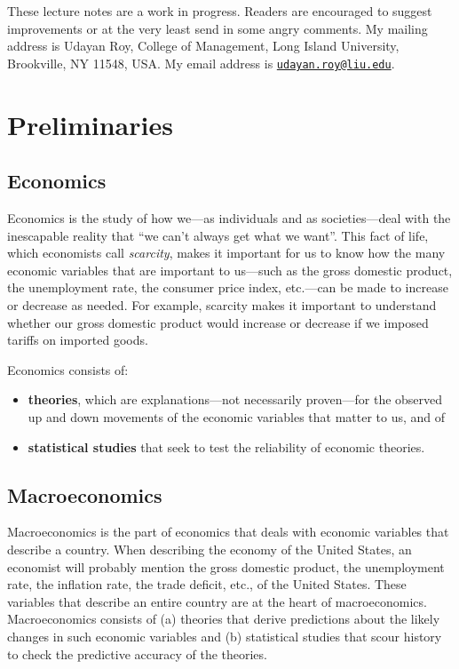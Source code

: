 \documentclass[
  letterpaper,
]{book}
\providecommand{\tightlist}{%
  \setlength{\itemsep}{0pt}\setlength{\parskip}{0pt}}\usepackage{longtable,booktabs,array}
\begin{document}
These lecture notes are a work in progress. Readers are encouraged to
suggest improvements or at the very least send in some angry comments.
My mailing address is Udayan Roy, College of Management, Long Island
University, Brookville, NY 11548, USA. My email address is
\href{mailto:udayan.roy@liu.edu}{\nolinkurl{udayan.roy@liu.edu}}.


\chapter{Preliminaries}\label{sec-preliminaries}

\section{Economics}\label{sec-economics}

Economics is the study of how we---as individuals and
as societies---deal with the inescapable reality that ``we can't always
get what we want''. This fact of life, which economists call
\emph{scarcity}, makes it important for us to know how the many economic
variables that are important to us---such as the gross domestic product,
the unemployment rate, the consumer price index, etc.---can be made to
increase or decrease as needed. For example, scarcity makes it important
to understand whether our gross domestic product would increase or
decrease if we imposed tariffs on imported goods.

Economics consists of:

\begin{itemize}
\tightlist
\item
  \textbf{theories}, which are explanations---not necessarily
  proven---for the observed up and down movements of the economic
  variables that matter to us, and of
\item
  \textbf{statistical studies} that seek to test the reliability of
  economic theories.
\end{itemize}

\section{Macroeconomics}\label{sec-macro}

Macroeconomics is the part of economics
that deals with economic variables that describe a country. When
describing the economy of the United States, an economist will probably
mention the gross domestic product, the unemployment rate, the inflation
rate, the trade deficit, etc., of the United States. These variables
that describe an entire country are at the heart of macroeconomics.
Macroeconomics consists of (a) theories that derive predictions about
the likely changes in such economic variables and (b) statistical
studies that scour history to check the predictive accuracy of the
theories.
\end{document}
